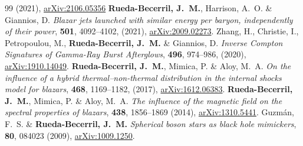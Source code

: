 \begin{thebibliography}{99}
  (2021), \href{https://arxiv.org/abs/2106.05356}{arXiv:2106.05356}
 \textbf{Rueda-Becerril, J.~M.}, Harrison,
  A.~O. \& Giannios, D. \textit{Blazar jets launched with similar energy per
  baryon, independently of their power},
  \href{https://doi.org/10.1093/mnras/staa3925}{\mnras} \textbf{501},
  4092--4102, (2021),
  \href{https://arxiv.org/abs/2009.02273}{arXiv:2009.02273}.
 Zhang, H., Christie, I., Petropoulou, M.,
  \textbf{Rueda-Becerril, J.~M.} \& Giannios, D. \textit{Inverse Compton
  Signatures of Gamma-Ray Burst Afterglows},
  \href{https://doi.org/10.1093/mnras/staa1583}{\mnras} \textbf{496}, 974--986,
  (2020), \href{https://arxiv.org/abs/1910.14049}{arXiv:1910.14049}.
 \textbf{Rueda-Becerril, J.~M.}, Mimica, P. \&
  Aloy, M.~A. \textit{On the influence of a hybrid thermal--non-thermal
  distribution in the internal shocks model for blazars},
  \href{https://doi.org/10.1093/mnras/stx476}{\mnras} \textbf{468}, 1169--1182,
  (2017), \href{https://arxiv.org/abs/1612.06383}{arXiv:1612.06383}.
 \textbf{Rueda-Becerril, J.~M.}, Mimica, P. \&
  Aloy, M.~A. \textit{The influence of the magnetic field on the spectral
  properties of blazars}, \href{https://doi.org/10.1093/mnras/stt2335}{\mnras}
  \textbf{438}, 1856--1869 (2014),
  \href{https://arxiv.org/abs/1310.5441}{arXiv:1310.5441}.
 Guzmán, F.~S. \& \textbf{Rueda-Becerril, J.~M.}
  \textit{Spherical boson stars as black hole mimickers},
  \href{https://doi.org/10.1103/PhysRevD.80.084023}{\prd} \textbf{80}, 084023
  (2009), \href{https://arxiv.org/abs/1009.1250}{arXiv:1009.1250}.
\end{thebibliography}

